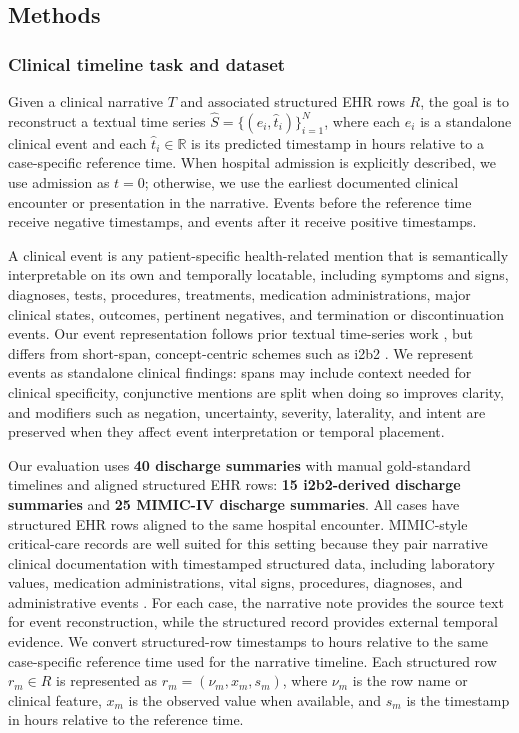 \subsection{Methods}
\label{ch08:sec:methods}
\ChEightHeadingOnly


\subsubsection{Clinical timeline task and dataset}
\label{ch08:sec:data}


Given a clinical narrative $T$ and associated structured EHR rows $R$, the goal is to reconstruct a textual time series $\hat{S}=\{(e_i,\hat{t}_i)\}_{i=1}^{N}$, where each $e_i$ is a standalone clinical event and each $\hat{t}_i \in \mathbb{R}$ is its predicted timestamp in hours relative to a case-specific reference time.
When hospital admission is explicitly described, we use admission as $t=0$; otherwise, we use the earliest documented clinical encounter or presentation in the narrative.
Events before the reference time receive negative timestamps, and events after it receive positive timestamps.

A clinical event is any patient-specific health-related mention that is semantically interpretable on its own and temporally locatable, including symptoms and signs, diagnoses, tests, procedures, treatments, medication administrations, major clinical states, outcomes, pertinent negatives, and termination or discontinuation events.
Our event representation follows prior textual time-series work \cite{ch08:wang2025large,noroozizadeh2026reconstructing,ch08:noroozizadeh2025pmoa,ch08:kumar2026temporally}, but differs from short-span, concept-centric schemes such as i2b2 \cite{ch08:uzuner20112010,sun2013evaluating}.
We represent events as standalone clinical findings: spans may include context needed for clinical specificity, conjunctive mentions are split when doing so improves clarity, and modifiers such as negation, uncertainty, severity, laterality, and intent are preserved when they affect event interpretation or temporal placement.

Our evaluation uses \textbf{40 discharge summaries} with manual gold-standard timelines and aligned structured EHR rows: \textbf{15 i2b2-derived discharge summaries} and \textbf{25 MIMIC-IV discharge summaries}.
All cases have structured EHR rows aligned to the same hospital encounter.
MIMIC-style critical-care records are well suited for this setting because they pair narrative clinical documentation with timestamped structured data, including laboratory values, medication administrations, vital signs, procedures, diagnoses, and administrative events \cite{ch08:johnson2016mimic,ch08:johnson2023mimic}.
For each case, the narrative note provides the source text for event reconstruction, while the structured record provides external temporal evidence.
We convert structured-row timestamps to hours relative to the same case-specific reference time used for the narrative timeline.
Each structured row $r_m \in R$ is represented as $r_m=(\nu_m,x_m,s_m)$, where $\nu_m$ is the row name or clinical feature, $x_m$ is the observed value when available, and $s_m$ is the timestamp in hours relative to the reference time.

